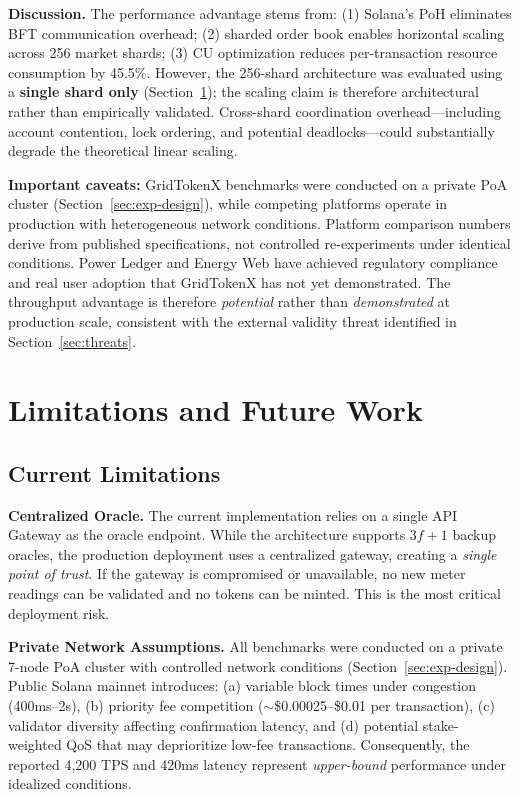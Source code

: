 \documentclass[conference]{IEEEtran}
\begin{document}
\textbf{Discussion.} The performance advantage stems from: (1) Solana's PoH eliminates BFT communication overhead; (2) sharded order book enables horizontal scaling across 256 market shards; (3) CU optimization reduces per-transaction resource consumption by 45.5\%. However, the 256-shard architecture was evaluated using a \textbf{single shard only} (Section~\ref{sec:limitations}); the scaling claim is therefore architectural rather than empirically validated. Cross-shard coordination overhead---including account contention, lock ordering, and potential deadlocks---could substantially degrade the theoretical linear scaling.

\textbf{Important caveats:} GridTokenX benchmarks were conducted on a private PoA cluster (Section~\ref{sec:exp-design}), while competing platforms operate in production with heterogeneous network conditions. Platform comparison numbers derive from published specifications, not controlled re-experiments under identical conditions. Power Ledger and Energy Web have achieved regulatory compliance and real user adoption that GridTokenX has not yet demonstrated. The throughput advantage is therefore \textit{potential} rather than \textit{demonstrated} at production scale, consistent with the external validity threat identified in Section~\ref{sec:threats}.

\section{Limitations and Future Work}
\label{sec:limitations}

\subsection{Current Limitations}

\textbf{Centralized Oracle.} The current implementation relies on a single API Gateway as the oracle endpoint. While the architecture supports $3f+1$ backup oracles, the production deployment uses a centralized gateway, creating a \textit{single point of trust}. If the gateway is compromised or unavailable, no new meter readings can be validated and no tokens can be minted. This is the most critical deployment risk.

\textbf{Private Network Assumptions.} All benchmarks were conducted on a private 7-node PoA cluster with controlled network conditions (Section~\ref{sec:exp-design}). Public Solana mainnet introduces: (a) variable block times under congestion (400ms--2s), (b) priority fee competition ($\sim$\$0.00025--\$0.01 per transaction), (c) validator diversity affecting confirmation latency, and (d) potential stake-weighted QoS that may deprioritize low-fee transactions. Consequently, the reported 4,200 TPS and 420ms latency represent \textit{upper-bound} performance under idealized conditions.
\end{document}
